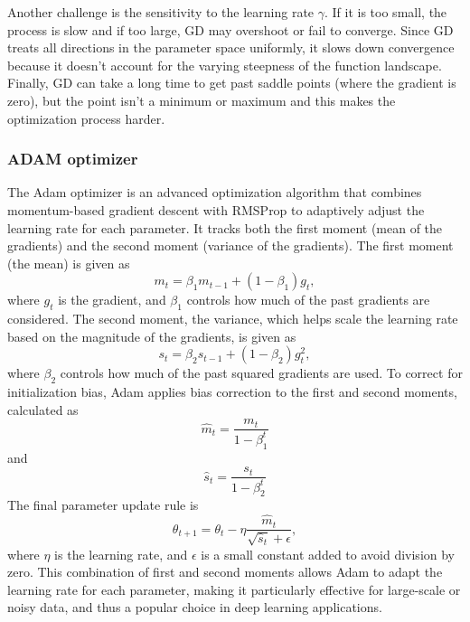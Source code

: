 Another challenge is the sensitivity to the learning rate \(\gamma\). If it is too small, the process is slow and if too large, GD may overshoot or fail to converge. Since GD treats all directions in the parameter space uniformly, it slows down convergence because it doesn’t account for the varying steepness of the function landscape. 
Finally, GD can take a long time to get past saddle points (where the gradient is zero), but the point isn't a minimum or maximum and this makes the optimization process harder.



\subsubsection{ADAM optimizer}

The Adam optimizer is an advanced optimization algorithm that combines momentum-based gradient descent with RMSProp to adaptively adjust the learning rate for each parameter. It tracks both the first moment (mean of the gradients) and the second moment (variance of the gradients). 
The first moment (the mean) is given as 
\begin{equation}
    m_t = \beta_1 m_{t-1} + (1 - \beta_1) g_t, 
\end{equation}
where \( g_t \) is the gradient, and \( \beta_1 \) controls how much of the past gradients are considered. 
The second moment, the variance, which helps scale the learning rate based on the magnitude of the gradients, is given as 
\begin{equation}
     s_t = \beta_2 s_{t-1} + (1 - \beta_2) g_t^2, 
\end{equation}
where \( \beta_2 \) controls how much of the past squared gradients are used.
To correct for initialization bias, Adam applies bias correction to the first and second moments, calculated as 
\[ \hat{m}_t = \frac{m_t}{1 - \beta_1^t} \]
and \[ \hat{s}_t = \frac{s_t}{1 - \beta_2^t} \]
The final parameter update rule is
\begin{equation}
    \theta_{t+1} = \theta_t - \eta \frac{\hat{m}_t}{\sqrt{\hat{s}_t} + \epsilon}, 
\end{equation}
where \( \eta \) is the learning rate, and \( \epsilon \) is a small constant added to avoid division by zero. This combination of first and second moments allows Adam to adapt the learning rate for each parameter, making it particularly effective for large-scale or noisy data, and thus a popular choice in deep learning applications.





